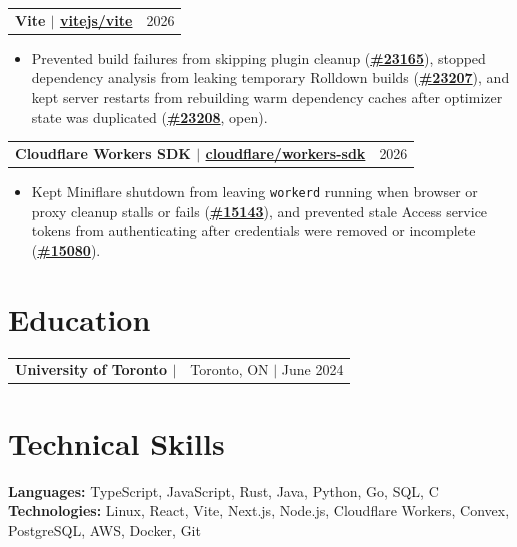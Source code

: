 \documentclass[letterpaper,11pt]{article}
\makeatletter
\newcommand{\resumeHeadingSimple}[2]{%
  \begin{tabularx}{\textwidth}{@{}Xr@{}}
    \textbf{#1} & #2
  \end{tabularx}\vspace{-1pt}
}
\newcommand{\resumeItemListStart}{\begin{itemize}[leftmargin=0.23in,itemsep=0.4pt,parsep=0pt,topsep=0.5pt]}
\newcommand{\resumeItem}[1]{\item\fontsize{10.2pt}{11.5pt}\selectfont #1}
\newcommand{\resumeItemListEnd}{\end{itemize}\vspace{-1.25pt}}
\makeatother
\begin{document}
\resumeHeadingSimple
  {Vite $|$ \href{https://redirect.github.com/vitejs/vite}{vitejs/vite}}
  {2026}
\resumeItemListStart
  \resumeItem{Prevented build failures from skipping plugin cleanup (\href{https://redirect.github.com/vitejs/vite/pull/23165}{\textbf{\#23165}}), stopped dependency analysis from leaking temporary Rolldown builds (\href{https://redirect.github.com/vitejs/vite/pull/23207}{\textbf{\#23207}}), and kept server restarts from rebuilding warm dependency caches after optimizer state was duplicated (\href{https://redirect.github.com/vitejs/vite/pull/23208}{\textbf{\#23208}}, open).}
\resumeItemListEnd

\resumeHeadingSimple
  {Cloudflare Workers SDK $|$ \href{https://redirect.github.com/cloudflare/workers-sdk}{cloudflare/workers-sdk}}
  {2026}
\resumeItemListStart
  \resumeItem{Kept Miniflare shutdown from leaving \texttt{workerd} running when browser or proxy cleanup stalls or fails (\href{https://redirect.github.com/cloudflare/workers-sdk/pull/15143}{\textbf{\#15143}}), and prevented stale Access service tokens from authenticating after credentials were removed or incomplete (\href{https://redirect.github.com/cloudflare/workers-sdk/pull/15080}{\textbf{\#15080}}).}
\resumeItemListEnd

\section{Education}
\resumeHeadingSimple
  {University of Toronto $|$ \normalfont{BSc in Mathematics, Statistics \& Computer Science}}
  {Toronto, ON $|$ June 2024}
\vspace{-3pt}
\section{Technical Skills}
\small
\textbf{Languages:} TypeScript, JavaScript, Rust, Java, Python, Go, SQL, C \quad
\textbf{Technologies:} Linux, React, Vite, Next.js, Node.js, Cloudflare Workers, Convex, PostgreSQL, AWS, Docker, Git
\end{document}
